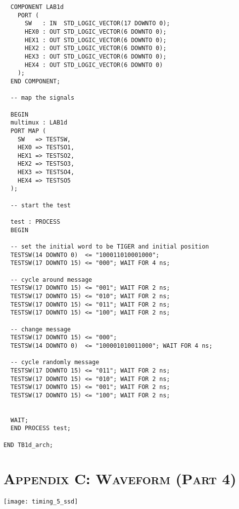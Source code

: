 \documentclass[11pt]{report}
\begin{document}
\begin{spacing}{1.5}
\begin{lstlisting}
  COMPONENT LAB1d
    PORT (
      SW   : IN  STD_LOGIC_VECTOR(17 DOWNTO 0);
      HEX0 : OUT STD_LOGIC_VECTOR(6 DOWNTO 0);
      HEX1 : OUT STD_LOGIC_VECTOR(6 DOWNTO 0);
      HEX2 : OUT STD_LOGIC_VECTOR(6 DOWNTO 0);
      HEX3 : OUT STD_LOGIC_VECTOR(6 DOWNTO 0);
      HEX4 : OUT STD_LOGIC_VECTOR(6 DOWNTO 0) 
    );
  END COMPONENT;

  -- map the signals

  BEGIN
  multimux : LAB1d
  PORT MAP (
    SW   => TESTSW,
    HEX0 => TESTSO1,
    HEX1 => TESTSO2,
    HEX2 => TESTSO3,
    HEX3 => TESTSO4,
    HEX4 => TESTSO5
  );

  -- start the test

  test : PROCESS                                                                                   
  BEGIN                                                         
  
  -- set the initial word to be TIGER and initial position
  TESTSW(14 DOWNTO 0)  <= "100011010001000";
  TESTSW(17 DOWNTO 15) <= "000"; WAIT FOR 4 ns;

  -- cycle around message
  TESTSW(17 DOWNTO 15) <= "001"; WAIT FOR 2 ns;
  TESTSW(17 DOWNTO 15) <= "010"; WAIT FOR 2 ns;
  TESTSW(17 DOWNTO 15) <= "011"; WAIT FOR 2 ns;
  TESTSW(17 DOWNTO 15) <= "100"; WAIT FOR 2 ns;

  -- change message
  TESTSW(17 DOWNTO 15) <= "000";
  TESTSW(14 DOWNTO 0)  <= "100001010011000"; WAIT FOR 4 ns;

  -- cycle randomly message
  TESTSW(17 DOWNTO 15) <= "011"; WAIT FOR 2 ns;
  TESTSW(17 DOWNTO 15) <= "010"; WAIT FOR 2 ns;
  TESTSW(17 DOWNTO 15) <= "001"; WAIT FOR 2 ns;
  TESTSW(17 DOWNTO 15) <= "100"; WAIT FOR 2 ns;


  WAIT;                                                        
  END PROCESS test;
                                          
END TB1d_arch;
\end{lstlisting}

\chapter*{\scshape Appendix C: Waveform (Part 4)}
\label{app:c}

\vspace{45px}
\centering
\texttt{[image: timing\_5\_ssd]}


\end{spacing}
\end{document}
